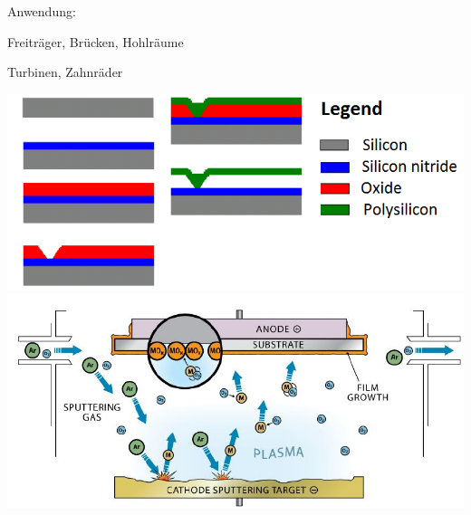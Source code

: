     \hfill
    \begin{minipage}{0.5\textwidth}
    \vspace{-0pt}
      \begin{compactitem}
       \item Anwendung:
        \begin{compactitem}
          \item Freiträger, Brücken, Hohlräume
          \item Turbinen, Zahnräder
        \end{compactitem}
      \end{compactitem}
      \includegraphics[width=1\textwidth]{images/Schichtenaufbau}
      \includegraphics[width=1.\textwidth]{images/Sputtering}
	\end{minipage}


